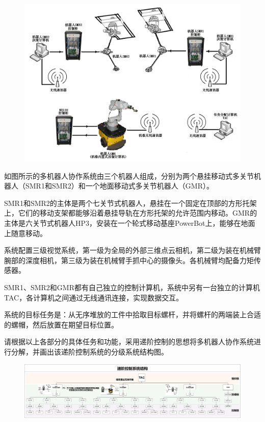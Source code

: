 \documentclass[12pt,a4paper,UTF8]{article}
\begin{document}



\begin{figure}[hbtp]
    \centering
    \includegraphics[width=\linewidth]{figures/1.png}
\end{figure}


\begin{problem}
如图所示的多机器人协作系统由三个机器人组成，分别为两个悬挂移动式多关节机器人（SMR1和SMR2）和一个地面移动式多关节机器人（GMR）。

SMR1和SMR2的主体是两个七关节式机器人，悬挂在一个固定在顶部的方形托架上，它们的移动支架都能够沿着悬挂导轨在方形托架的允许范围内移动。GMR的主体是六关节式机器人HP3，安装在一个轮式移动基座PowerBot上，能够在地面上随意移动。

系统配置三级视觉系统，第一级为全局的外部三维点云相机，第二级为装在机械臂腕部的深度相机，第三级为装在机械臂手抓中心的摄像头。各机械臂均配备力矩传感器。

SMR1、SMR2和GMR都有自己独立的控制计算机，系统中另有一台独立的计算机TAC，各计算机之间通过无线通讯连接，实现数据交互。

系统的目标任务是：从无序堆放的工件中拾取目标螺杆，并将螺杆的两端装上合适的螺帽，然后放置在期望目标位置。

请根据以上各部分的具体任务和功能，采用递阶控制的思想将多机器人协作系统进行分解，并画出该递阶控制系统的分级系统结构图。

\end{problem}

\begin{figure}[htbp]
    \centering
    \includegraphics[width=1\linewidth]{figures/hw01.jpg}
\end{figure}
\end{document}
